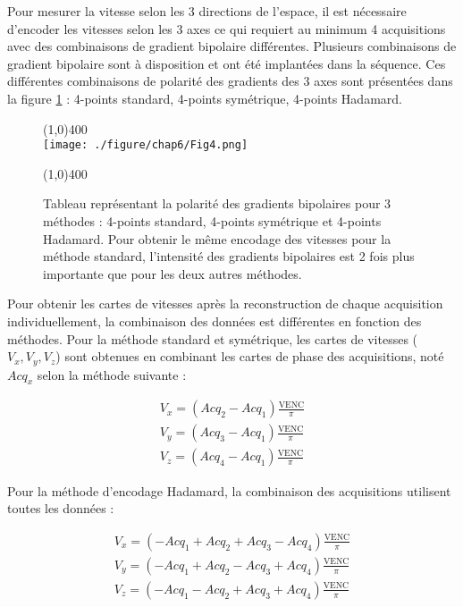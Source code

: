 Pour mesurer la vitesse selon les 3 directions de l'espace, il est nécessaire d'encoder les vitesses selon les 3 axes ce qui requiert au minimum 4 acquisitions avec des combinaisons de gradient bipolaire différentes. Plusieurs combinaisons de gradient bipolaire sont à disposition et ont été implantées dans la séquence. Ces différentes combinaisons de polarité des gradients des 3 axes sont présentées dans la figure \ref{fig:EncFlux} : 4-points standard, 4-points symétrique, 4-points Hadamard. 

\begin{figure}[H]
\centering
\line(1,0){400} \\
\texttt{[image: ./figure/chap6/Fig4.png]}
\caption[Méthode encodage flux]{\label{fig:EncFlux} Tableau représentant la polarité des gradients bipolaires pour 3 méthodes : 4-points standard, 4-points symétrique et 4-points Hadamard. Pour obtenir le même encodage des vitesses pour la méthode standard, l'intensité des gradients bipolaires est 2 fois plus importante que pour les deux autres méthodes.}
\line(1,0){400} \\ 
\end{figure}

Pour obtenir les cartes de vitesses après la reconstruction de chaque acquisition individuellement, la combinaison des données est différentes en fonction des méthodes. Pour la méthode standard et symétrique, les cartes de vitesses ($V_x,V_y,V_z$) sont obtenues en combinant les cartes de phase des acquisitions, noté $Acq_x$ selon la méthode suivante :

\begin{equation}
\begin{split}
V_x = (Acq_2-Acq_1) \frac{\text{VENC}}{\pi} \\
V_y = (Acq_3-Acq_1 ) \frac{\text{VENC}}{\pi}\\
V_z = (Acq_4-Acq_1 ) \frac{\text{VENC}}{\pi}
\end{split}
\end{equation}

Pour la méthode d'encodage Hadamard, la combinaison des acquisitions utilisent toutes les données :

\begin{equation}
\begin{split}
V_x = (-Acq_1+Acq_2+Acq_3-Acq_4) \frac{\text{VENC}}{\pi} \\
V_y = (-Acq_1+Acq_2-Acq_3+Acq_4 ) \frac{\text{VENC}}{\pi}\\
V_z = (-Acq_1-Acq_2+Acq_3+Acq_4 ) \frac{\text{VENC}}{\pi}
\end{split}
\end{equation}


